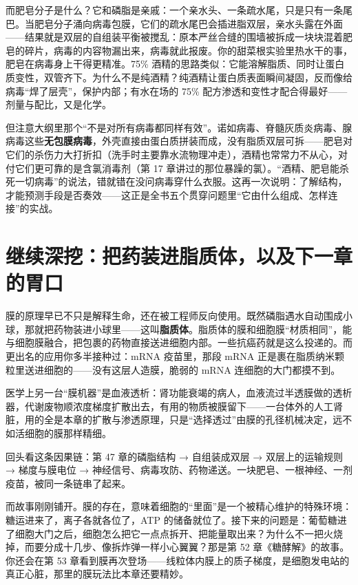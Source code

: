 而肥皂分子是什么？它和磷脂是亲戚：一个亲水头、一条疏水尾，只是只有一条尾巴。当肥皂分子涌向病毒包膜，它们的疏水尾巴会插进脂双层，亲水头露在外面——结果就是双层的自组装平衡被搅乱：原本严丝合缝的围墙被拆成一块块混着肥皂的碎片，病毒的内容物漏出来，病毒就此报废。你的甜菜根实验里热水干的事，肥皂在病毒身上干得更精准。75\% 酒精的思路类似：它能溶解脂质、同时让蛋白质变性，双管齐下。为什么不是纯酒精？纯酒精让蛋白质表面瞬间凝固，反而像给病毒“焊了层壳”，保护内部；有水在场的 75\% 配方渗透和变性才配合得最好——剂量与配比，又是化学。

但注意大纲里那个“不是对所有病毒都同样有效”。诺如病毒、脊髓灰质炎病毒、腺病毒这些\textbf{无包膜病毒}，外壳直接由蛋白质拼装而成，没有脂质双层可拆——肥皂对它们的杀伤力大打折扣（洗手时主要靠水流物理冲走），酒精也常常力不从心，对付它们更可靠的是含氯消毒剂（第 17 章讲过的那位暴躁的氯）。“酒精、肥皂能杀死一切病毒”的说法，错就错在没问病毒穿什么衣服。这再一次说明：了解结构，才能预测手段是否奏效——这正是全书五个贯穿问题里“它由什么组成、怎样连接”的实战。

\section{继续深挖：把药装进脂质体，以及下一章的胃口}

膜的原理早已不只是解释生命，还在被工程师反向使用。既然磷脂遇水自动围成小球，那就把药物装进小球里——这叫\textbf{脂质体}。脂质体的膜和细胞膜“材质相同”，能与细胞膜融合，把包裹的药物直接送进细胞内部。一些抗癌药就是这么投递的。而更出名的应用你多半接种过：mRNA 疫苗里，那段 mRNA 正是裹在脂质纳米颗粒里送进细胞的——没有这层人造膜，脆弱的 mRNA 连细胞的大门都摸不到。

医学上另一台“膜机器”是血液透析：肾功能衰竭的病人，血液流过半透膜做的透析器，代谢废物顺浓度梯度扩散出去，有用的物质被膜留下——一台体外的人工肾脏，用的全是本章的扩散与渗透原理，只是“选择透过”由膜的孔径机械决定，远不如活细胞的膜那样精细。

回头看这条因果链：第 47 章的磷脂结构 → 自组装成双层 → 双层上的运输规则 → 梯度与膜电位 → 神经信号、病毒攻防、药物递送。一块肥皂、一根神经、一剂疫苗，被同一条链串了起来。

而故事刚刚铺开。膜的存在，意味着细胞的“里面”是一个被精心维护的特殊环境：糖运进来了，离子各就各位了，ATP 的储备就位了。接下来的问题是：葡萄糖进了细胞大门之后，细胞怎么把它一点点拆开、把能量取出来？为什么不一把火烧掉，而要分成十几步、像拆炸弹一样小心翼翼？那是第 52 章《糖酵解》的故事。你还会在第 53 章看到膜再次登场——线粒体内膜上的质子梯度，是细胞发电站的真正心脏，那里的膜玩法比本章还要精妙。

